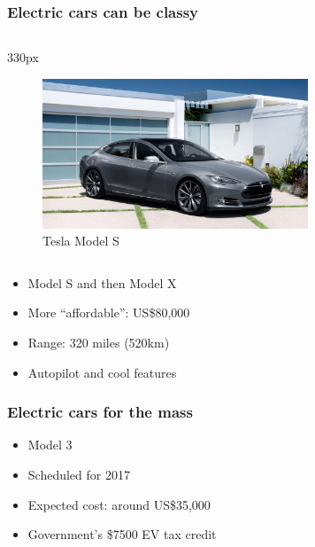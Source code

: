 {
\logo{}
\begin{frame}
\frametitle{Electric cars can be classy}
\begin{center}
\begin{columns}
\begin{column}{330px}
{
    \begin{figure}[h!]
        \centering
        \includegraphics[width=300px]
            {images/tesla-model-s.jpg}
        \vspace{-0.5em}
        \caption{Tesla Model S}
    \end{figure}
}
\end{column}
\end{columns}
\end{center}
\end{frame}
}

\begin{frame}
\begin{itemize}
    \itemsep1.5em
    \item Model S and then Model X
    \item More ``affordable'': US\$80,000
    \item Range: 320 miles (520km)
    \item Autopilot and cool features
\end{itemize}
\end{frame}

\begin{frame}
\frametitle{Electric cars for the mass}
\begin{itemize}
    \itemsep1.5em
    \item Model 3
    \item Scheduled for 2017
    \item Expected cost: around US\$35,000
    \item Government's \$7500 EV tax credit
\end{itemize}
\end{frame}
